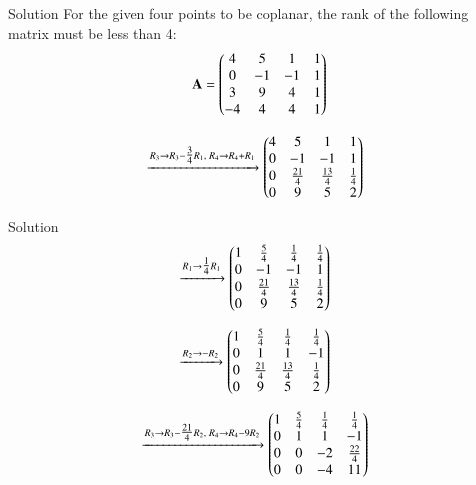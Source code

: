 \documentclass{beamer}
\begin{document}
\begin{frame}{Solution}
    For the given four points to be coplanar, the rank of the following matrix must be less than 4:
\begin{align}
\mathbf{A}=\begin{pmatrix} 
4 & 5 & 1 & 1\\
0 & -1 & -1 & 1 \\
3 & 9 & 4 & 1\\
-4 & 4 & 4 & 1 
\end{pmatrix}
\end{align}

\begin{align}
&\xrightarrow{R_3 \to R_3 - \tfrac{3}{4}R_1,\; R_4 \to R_4 + R_1}
\begin{pmatrix}
4 & 5 & 1 & 1 \\
0 & -1 & -1 & 1 \\
0 & \tfrac{21}{4} & \tfrac{13}{4} & \tfrac{1}{4} \\
0 & 9 & 5 & 2
\end{pmatrix}
\end{align}
\end{frame}
\begin{frame}{Solution}
\begin{align}
&\xrightarrow{R_1 \to \tfrac{1}{4}R_1}
\begin{pmatrix}
1 & \tfrac{5}{4} & \tfrac{1}{4} & \tfrac{1}{4} \\
0 & -1 & -1 & 1 \\
0 & \tfrac{21}{4} & \tfrac{13}{4} & \tfrac{1}{4} \\
0 & 9 & 5 & 2
\end{pmatrix}
\end{align}

\begin{align}
&\xrightarrow{R_2 \to -R_2}
\begin{pmatrix}
1 & \tfrac{5}{4} & \tfrac{1}{4} & \tfrac{1}{4} \\
0 & 1 & 1 & -1 \\
0 & \tfrac{21}{4} & \tfrac{13}{4} & \tfrac{1}{4} \\
0 & 9 & 5 & 2
\end{pmatrix}
\end{align}

\begin{align}
&\xrightarrow{R_3 \to R_3 - \tfrac{21}{4}R_2,\; R_4 \to R_4 - 9R_2}
\begin{pmatrix}
1 & \tfrac{5}{4} & \tfrac{1}{4} & \tfrac{1}{4} \\
0 & 1 & 1 & -1 \\
0 & 0 & -2 & \tfrac{22}{4} \\
0 & 0 & -4 & 11
\end{pmatrix}
\end{align}
\end{frame}
\end{document}

